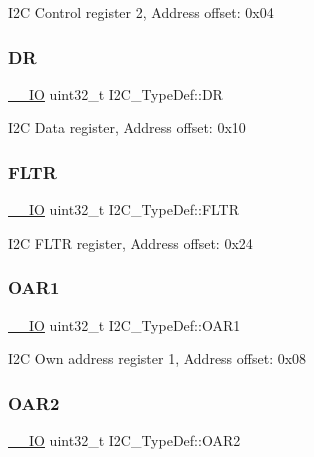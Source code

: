 I2C Control register 2, Address offset\+: 0x04 \mbox{\label{struct_i2_c___type_def_a5c1beaa4935359da1c8f0ceb287f90be}} 
\subsubsection{\texorpdfstring{DR}{DR}}
{\footnotesize\ttfamily \hyperlink{core__sc300_8h_aec43007d9998a0a0e01faede4133d6be}{\+\_\+\+\_\+\+IO} uint32\+\_\+t I2\+C\+\_\+\+Type\+Def\+::\+DR}

I2C Data register, Address offset\+: 0x10 \mbox{\label{struct_i2_c___type_def_a6b540b18ea0370e3e45f69902343320c}} 
\subsubsection{\texorpdfstring{F\+L\+TR}{FLTR}}
{\footnotesize\ttfamily \hyperlink{core__sc300_8h_aec43007d9998a0a0e01faede4133d6be}{\+\_\+\+\_\+\+IO} uint32\+\_\+t I2\+C\+\_\+\+Type\+Def\+::\+F\+L\+TR}

I2C F\+L\+TR register, Address offset\+: 0x24 \mbox{\label{struct_i2_c___type_def_ae8269169fcbdc2ecb580208d99c2f89f}} 
\subsubsection{\texorpdfstring{O\+A\+R1}{OAR1}}
{\footnotesize\ttfamily \hyperlink{core__sc300_8h_aec43007d9998a0a0e01faede4133d6be}{\+\_\+\+\_\+\+IO} uint32\+\_\+t I2\+C\+\_\+\+Type\+Def\+::\+O\+A\+R1}

I2C Own address register 1, Address offset\+: 0x08 \mbox{\label{struct_i2_c___type_def_a73988a218be320999c74a641b3d6e3c1}} 
\subsubsection{\texorpdfstring{O\+A\+R2}{OAR2}}
{\footnotesize\ttfamily \hyperlink{core__sc300_8h_aec43007d9998a0a0e01faede4133d6be}{\+\_\+\+\_\+\+IO} uint32\+\_\+t I2\+C\+\_\+\+Type\+Def\+::\+O\+A\+R2}

